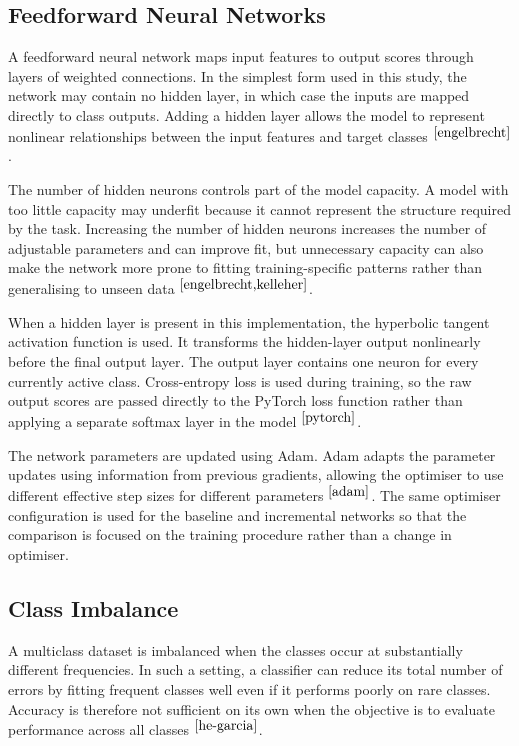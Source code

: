 \documentclass[conference]{IEEEtran}
\begin{document}
\subsection{Feedforward Neural Networks}

A feedforward neural network maps input features to output scores through layers of weighted connections. In the simplest form used in this study, the network may contain no hidden layer, in which case the inputs are mapped directly to class outputs. Adding a hidden layer allows the model to represent nonlinear relationships between the input features and target classes $^{\cite{engelbrecht}}$.

The number of hidden neurons controls part of the model capacity. A model with too little capacity may underfit because it cannot represent the structure required by the task. Increasing the number of hidden neurons increases the number of adjustable parameters and can improve fit, but unnecessary capacity can also make the network more prone to fitting training-specific patterns rather than generalising to unseen data $^{\cite{engelbrecht,kelleher}}$.

When a hidden layer is present in this implementation, the hyperbolic tangent activation function is used. It transforms the hidden-layer output nonlinearly before the final output layer. The output layer contains one neuron for every currently active class. Cross-entropy loss is used during training, so the raw output scores are passed directly to the PyTorch loss function rather than applying a separate softmax layer in the model $^{\cite{pytorch}}$.

The network parameters are updated using Adam. Adam adapts the parameter updates using information from previous gradients, allowing the optimiser to use different effective step sizes for different parameters $^{\cite{adam}}$. The same optimiser configuration is used for the baseline and incremental networks so that the comparison is focused on the training procedure rather than a change in optimiser.

\subsection{Class Imbalance}

A multiclass dataset is imbalanced when the classes occur at substantially different frequencies. In such a setting, a classifier can reduce its total number of errors by fitting frequent classes well even if it performs poorly on rare classes. Accuracy is therefore not sufficient on its own when the objective is to evaluate performance across all classes $^{\cite{he-garcia}}$.
\end{document}
